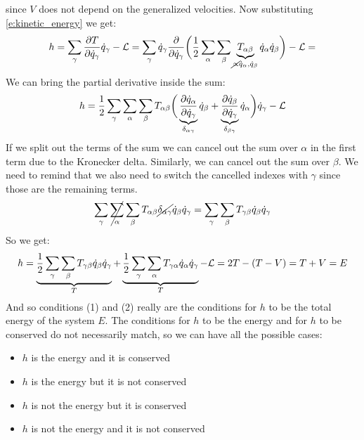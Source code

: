 since $V$ does not depend on the generalized velocities. Now substituting \eqref{e:kinetic_energy} we get:
\begin{equation}
    h = \bigsum_{\gamma}\pdv{ T}{ \dot{q}_{\gamma}}\dot{q}_{\gamma} - \lagr = \bigsum_{\gamma}\dot{q}_{\gamma}\pdv{}{ \dot{q}_{\gamma}}\bbrackets{\dfrac{1}{2}\bigsum_{\alpha}\bigsum_{\beta}\underbrace{T_{\alpha \beta}}_{\cancel{\propto} \dot{q}_{\alpha}, \dot{q}_{\beta}}\dot{q}_{\alpha}\dot{q}_{\beta}}  - \lagr =
\end{equation}
We can bring the partial derivative inside the sum:
\begin{equation}
    h = \dfrac{1}{2}\bigsum_{\gamma}\bigsum_{\alpha}\bigsum_{\beta}T_{\alpha \beta}\bbrackets{\underbrace{\pdv{ \dot{q}_{\alpha}}{ \dot{q}_{\gamma}}}_{\delta_{\alpha \gamma}}\dot{q}_{\beta} + \underbrace{\pdv{ \dot{q}_{\beta}}{ \dot{q}_{\gamma}}}_{\delta_{\beta \gamma}}\dot{q}_{\alpha}}\dot{q}_{\gamma} - \lagr
\end{equation}
If we split out the terms of the sum we can cancel out the sum over $\alpha$ in the first term due to the Kronecker delta. Similarly, we can cancel out the sum over $\beta$. We need to remind that we also need to switch the cancelled indexes with $\gamma$ since those are the remaining terms.
\begin{equation}
    \displaystyle\sum_{\gamma}\cancel{\displaystyle\sum_{\alpha}}\displaystyle\sum_{\beta}T_{\alpha \beta }\cancel{\delta_{\alpha \gamma}}\dot{q}_{\beta}\dot{q}_{\gamma} = \displaystyle\sum_{\gamma}\displaystyle\sum_{\beta}T_{\gamma \beta }\dot{q}_{\beta}\dot{q}_{\gamma}
\end{equation}
So we get:
\begin{equation}
    h = \underbrace{\dfrac{1}{2}\displaystyle\sum_{\gamma}\displaystyle\sum_{\beta}T_{\gamma \beta }\dot{q}_{\beta}\dot{q}_{\gamma}}_{T} + \underbrace{\dfrac{1}{2}\displaystyle\sum_{\gamma}\displaystyle\sum_{\alpha}T_{\gamma \alpha }\dot{q}_{\alpha}\dot{q}_{\gamma}}_{T} - \mathcal{L} = 2T - (T-V) = T + V = E
\end{equation}
And so conditions (1) and (2) really are the conditions for $h$ to be the total energy of the system $E$. The conditions for $h$ to be the energy and for $h$ to be conserved do not necessarily match, so we can have all the possible cases:
\begin{itemize}
    \item $h$ is the energy and it is conserved
    \item $h$ is the energy but it is not conserved
    \item $h$ is not the energy but it is conserved
    \item $h$ is not the energy and it is not conserved
\end{itemize}
